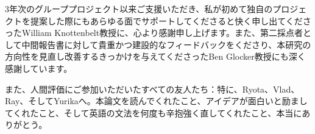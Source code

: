 \documentclass[12pt,twoside]{report}
\begin{document}
3年次のグループプロジェクト以来ご支援いただき、私が初めて独自のプロジェクトを提案した際にもあらゆる面でサポートしてくださると快く申し出てくださったWilliam Knottenbelt教授に、心より感謝申し上げます。また、第二採点者として中間報告書に対して貴重かつ建設的なフィードバックをくださり、本研究の方向性を見直し改善するきっかけを与えてくださったBen Glocker教授にも深く感謝しています。\par

また、人間評価にご参加いただいたすべての友人たち：特に、Ryota、Vlad、Ray、そしてYurikaへ。本論文を読んでくれたこと、アイデアが面白いと励ましてくれたこと、そして英語の文法を何度も辛抱強く直してくれたこと、本当にありがとう。\par

\clearpage{\pagestyle{empty}\cleardoublepage}

\tableofcontents


\clearpage{\pagestyle{empty}\cleardoublepage}
\setcounter{page}{1}
\fancyhead[LO,RE]{}








\printbibliography



\end{document}
